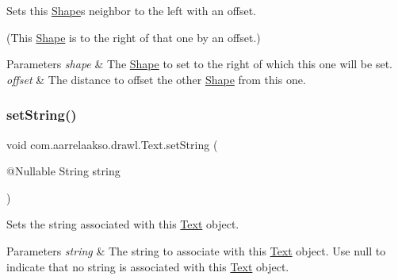 Sets this \hyperlink{classcom_1_1aarrelaakso_1_1drawl_1_1_shape}{Shape}\textquotesingle{}s neighbor to the left with an offset. 

(This \hyperlink{classcom_1_1aarrelaakso_1_1drawl_1_1_shape}{Shape} is to the right of that one by an offset.)


\begin{DoxyParams}{Parameters}
{\em shape} & The \hyperlink{classcom_1_1aarrelaakso_1_1drawl_1_1_shape}{Shape} to set to the right of which this one will be set. \\
\hline
{\em offset} & The distance to offset the other \hyperlink{classcom_1_1aarrelaakso_1_1drawl_1_1_shape}{Shape} from this one. \\
\hline
\end{DoxyParams}
\mbox{\label{classcom_1_1aarrelaakso_1_1drawl_1_1_text_a03668d250e9a1e99b9fa9214fdc40856}} 
\subsubsection{\texorpdfstring{set\+String()}{setString()}}
{\footnotesize\ttfamily void com.\+aarrelaakso.\+drawl.\+Text.\+set\+String (\begin{DoxyParamCaption}\item[{@Nullable String}]{string }\end{DoxyParamCaption})}



Sets the string associated with this \hyperlink{classcom_1_1aarrelaakso_1_1drawl_1_1_text}{Text} object. 


\begin{DoxyParams}{Parameters}
{\em string} & The string to associate with this \hyperlink{classcom_1_1aarrelaakso_1_1drawl_1_1_text}{Text} object. Use {\ttfamily null} to indicate that no string is associated with this \hyperlink{classcom_1_1aarrelaakso_1_1drawl_1_1_text}{Text} object. \\
\hline
\end{DoxyParams}
\mbox{\label{classcom_1_1aarrelaakso_1_1drawl_1_1_shape_a3930f6fe72f6c5e0c0aa4c25ffbf18ff}} 
